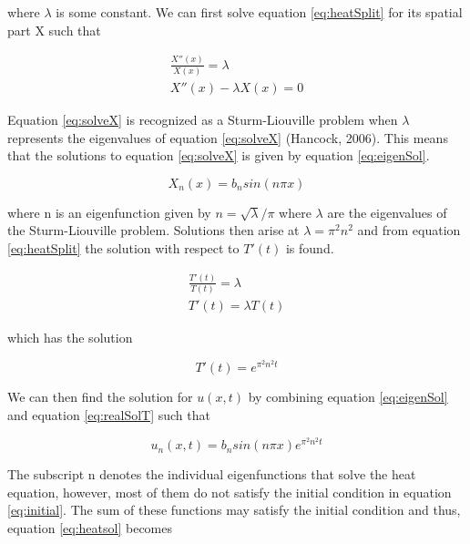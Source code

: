 \documentclass[12pt,a4paper]{article}
\begin{document}
\noindent where $\lambda$ is some constant. We can first solve equation \ref{eq:heatSplit} for its spatial part X such that

\begin{equation}\label{eq:solveX}
\begin{aligned}
\frac{X''(x)}{X(x)} = \lambda
\\
X''(x) - \lambda X(x) = 0
\end{aligned}
\end{equation}

\noindent Equation \ref{eq:solveX} is recognized as a Sturm-Liouville problem when $\lambda$ represents the eigenvalues of equation \ref{eq:solveX} (Hancock, 2006). This means that the solutions to equation \ref{eq:solveX} is given by equation \ref{eq:eigenSol}.

\begin{equation}\label{eq:eigenSol}
X_n(x)= b_n sin(n\pi x)
\end{equation}

\noindent where n is an eigenfunction given by $n = \sqrt{\lambda}/\pi$ where $\lambda$ are the eigenvalues of the Sturm-Liouville problem. Solutions then arise at $\lambda = \pi^2 n^2$ and from equation \ref{eq:heatSplit} the solution with respect to $T'(t)$ is found.

\begin{equation}\label{eq:eigenSolT}
\begin{aligned}
\frac{T'(t)}{T(t)} = \lambda
\\
T'(t) = \lambda T(t)
\end{aligned}
\end{equation}

\noindent which has the solution

\begin{equation}\label{eq:realSolT}
T'(t) = e^{\pi^2 n^2 t}
\end{equation}

\noindent We can then find the solution for $u(x,t)$ by combining equation \ref{eq:eigenSol} and equation \ref{eq:realSolT} such that

\begin{equation}\label{eq:heatsol}
u_n(x,t) = b_n sin(n\pi x)e^{\pi^2 n^2 t}
\end{equation}

\noindent The subscript n denotes the individual eigenfunctions that solve the heat equation, however, most of them do not satisfy the initial condition in equation \ref{eq:initial}. The sum of these functions may satisfy the initial condition and thus, equation \ref{eq:heatsol} becomes
\end{document}
